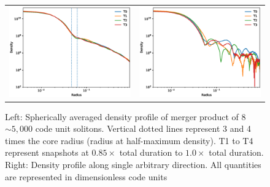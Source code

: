 \documentclass[a4paper,11pt]{article}
\begin{document}
\begin{figure}
\begin{tabular}{cc}
{\includegraphics[scale = 0.55, trim={1.5cm 0 0 1cm}]{pics/combined3.eps}} &
{\includegraphics[scale = 0.55, trim={2cm 0 0 1cm}]{pics/singles.eps}}
\end{tabular}
\caption{Left: Spherically averaged density profile of merger product of 8 $\sim 5,000$ code unit solitons. Vertical dotted lines represent 3 and 4 times the core radius (radius at half-maximum density). T1 to T4 represent snapshots at $0.85 \times$ total duration to $1.0 \times$ total duration. 
Right: Density profile along single arbitrary direction. All quantities are represented in dimensionless code units}\label{fig:pul}
\end{figure}
\end{document}
